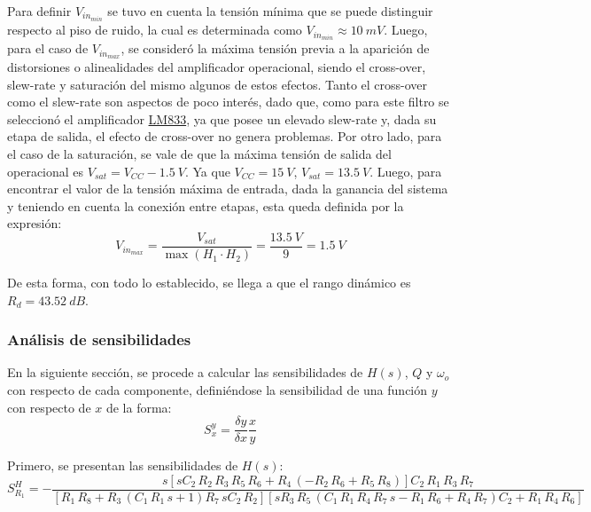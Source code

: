 Para definir $V_{in_{min}}$ se tuvo en cuenta la tensión mínima que se puede distinguir respecto al piso de ruido, la cual es determinada como $V_{in_{min}} \approx 10 \ mV$. Luego, para el caso de $V_{in_{max}}$, se consideró la máxima tensión previa a la aparición de distorsiones o alinealidades del amplificador operacional, siendo el cross-over, slew-rate y saturación del mismo algunos de estos efectos. Tanto el cross-over como el slew-rate son aspectos de poco interés, dado que, como para este filtro se seleccionó el amplificador \href{http://www.ti.com/lit/ds/symlink/lm833-n.pdf}{LM833}, ya que posee un elevado slew-rate y, dada su etapa de salida, el efecto de cross-over no genera problemas. Por otro lado, para el caso de la saturación, se vale de que la máxima tensión de salida del operacional es $V_{sat} = V_{CC} - 1.5 \ V$. Ya que $V_{CC} = 15 \ V$, $V_{sat} = 13.5 \ V$. Luego, para encontrar el valor de la tensión máxima de entrada, dada la ganancia del sistema y teniendo en cuenta la conexión entre etapas, esta queda definida por la expresión:
\begin{equation}
	V_{in_{max}}=\frac{V_{sat}}{  \max(H_{1} \cdot H_{2} )} = \frac{13.5 \ V}{9} = 1.5 \ V
\end{equation}

De esta forma, con todo lo establecido, se llega a que el rango dinámico es $R_d = 43.52 \ dB$.

\subsubsection{Análisis de sensibilidades}
En la siguiente sección, se procede a calcular las sensibilidades de $H(s)$, $Q$ y $\omega_o$ con respecto de cada componente, definiéndose la sensibilidad de una función $y$ con respecto de $x$ de la forma:
\begin{equation*}
	S_{x}^{y} = \frac{\delta y}{\delta x} \frac{x}{y}
\end{equation*}

Primero, se presentan las sensibilidades de $H\left(s \right)$:
\begin{equation}
S_{R_1}^{H} = -{\frac {s \left[ s{C_2}\,{R_2}\,{R_3}\,{R_5}\,{R_6}+{
R_4}\, \left( -{R_2}\,{R_6}+{R_5}\,{R_8} \right) 
 \right] {C_2}\,{R_1}\,{R_3}\,{R_7}}{ \left[ {R_1}\,{
R_8}+{R_3}\, \left( {C_1}\,{R_1}\,s+1 \right) {R_7}\,s{
C_2}\,{R_2} \right]  \left[ s{R_3}\,{R_5}\, \left( {C_1
}\,{R_1}\,{R_4}\,{R_7}\,s-{R_1}\,{R_6}+{R_4}\,{R_7} \right) {C_2}+{R_1}\,{R_4}\,{R_6} \right] }}
\end{equation}

